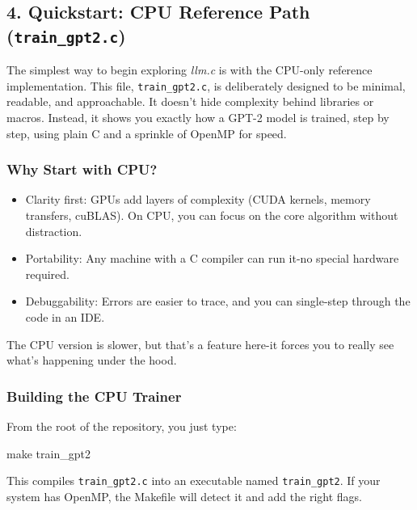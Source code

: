 \documentclass[
  letterpaper,
  DIV=11,
  numbers=noendperiod]{scrreprt}
\newenvironment{Shaded}{\begin{snugshade}}{\end{snugshade}}
\newcommand{\FunctionTok}[1]{\textcolor[rgb]{0.28,0.35,0.67}{#1}}
\newcommand{\NormalTok}[1]{\textcolor[rgb]{0.00,0.23,0.31}{#1}}
\providecommand{\tightlist}{%
  \setlength{\itemsep}{0pt}\setlength{\parskip}{0pt}}
\begin{document}
\subsection{\texorpdfstring{4. Quickstart: CPU Reference Path
(\texttt{train\_gpt2.c})}{4. Quickstart: CPU Reference Path (train\_gpt2.c)}}\label{quickstart-cpu-reference-path-train_gpt2.c}

The simplest way to begin exploring \emph{llm.c} is with the CPU-only
reference implementation. This file, \texttt{train\_gpt2.c}, is
deliberately designed to be minimal, readable, and approachable. It
doesn't hide complexity behind libraries or macros. Instead, it shows
you exactly how a GPT-2 model is trained, step by step, using plain C
and a sprinkle of OpenMP for speed.

\subsubsection{Why Start with CPU?}\label{why-start-with-cpu}

\begin{itemize}
\tightlist
\item
  Clarity first: GPUs add layers of complexity (CUDA kernels, memory
  transfers, cuBLAS). On CPU, you can focus on the core algorithm
  without distraction.
\item
  Portability: Any machine with a C compiler can run it-no special
  hardware required.
\item
  Debuggability: Errors are easier to trace, and you can single-step
  through the code in an IDE.
\end{itemize}

The CPU version is slower, but that's a feature here-it forces you to
really see what's happening under the hood.

\subsubsection{Building the CPU Trainer}\label{building-the-cpu-trainer}

From the root of the repository, you just type:

\begin{Shaded}
\begin{Highlighting}[]
\FunctionTok{make}\NormalTok{ train\_gpt2}
\end{Highlighting}
\end{Shaded}

This compiles \texttt{train\_gpt2.c} into an executable named
\texttt{train\_gpt2}. If your system has OpenMP, the Makefile will
detect it and add the right flags.
\end{document}

